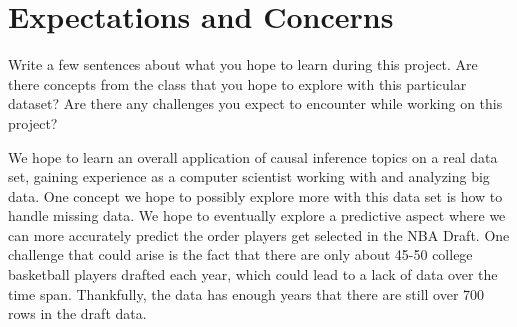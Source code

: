 \documentclass[12pt]{article}
\begin{document}
\section{Expectations and Concerns}

Write a few sentences about what you hope to learn during this project. Are there concepts from the class that you hope to explore with this particular dataset? Are there any challenges you expect to encounter while working on this project?

We hope to learn an overall application of causal inference topics on a real data set, gaining experience as a computer scientist working with and analyzing big data. One concept we hope to possibly explore more with this data set is how to handle missing data. We hope to eventually explore a predictive aspect where we can more accurately predict the order players get selected in the NBA Draft. One challenge that could arise is the fact that there are only about 45-50 college basketball players drafted each year, which could lead to a lack of data over the time span. Thankfully, the data has enough years that there are still over 700 rows in the draft data.
\end{document}
